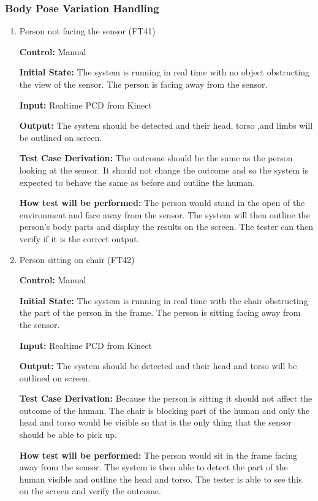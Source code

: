 \documentclass[12pt, titlepage]{article}
\begin{document}
\subsubsection{Body Pose Variation Handling}

\begin{enumerate}
  \item{Person not facing the sensor (FT41)}

  \textbf{Control:} Manual

  \textbf{Initial State:} The system is running in real time with no object obstructing the view of the sensor. The person is facing away from the sensor.
  
  \textbf{Input:} Realtime PCD from Kinect

  \textbf{Output:} The system should be detected and their head, torso ,and limbs will be outlined on screen.

  \textbf{Test Case Derivation:} The outcome should be the same as the person looking at the sensor. It should not change the outcome and so the system is expected to behave the same as before and outline the human.

  \textbf{How test will be performed:} The person would stand in the open of the environment and face away from the sensor. The system will then outline the person’s body parts and display the results on the screen. The tester can then verify if it is the correct output.

  \item{Person sitting on chair (FT42)}

  \textbf{Control:} Manual

  \textbf{Initial State:} The system is running in real time with the chair obstructing the part of the person in the frame. The person is sitting facing away from the sensor.

  \textbf{Input:} Realtime PCD from Kinect 

  \textbf{Output:} The system should be detected and their head and torso will be outlined on screen.

  \textbf{Test Case Derivation:} Because the person is sitting it should not affect the outcome of the human. The chair is blocking part of the human and only the head and torso would be visible so that is the only thing that the sensor should be able to pick up.

  \textbf{How test will be performed:}  The person would sit in the frame facing away from the sensor. The system is then able to detect the part of the human visible and outline the head and torso. The tester is able to see this on the screen and verify the outcome.


\end{enumerate}
\end{document}
